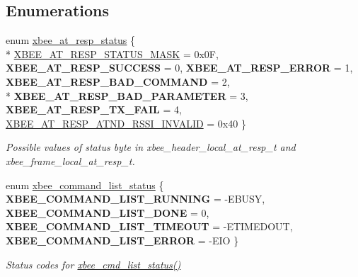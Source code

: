 \subsection*{Enumerations}
\begin{DoxyCompactItemize}
\item 
enum \hyperlink{group__xbee__atcmd_gac6a27f1b1ee32b75b6f966afbb347f22}{xbee\-\_\-at\-\_\-resp\-\_\-status} \{ \\*
\hyperlink{group__xbee__atcmd_ggac6a27f1b1ee32b75b6f966afbb347f22adb75bf991027151c1aa20a454e278145}{X\-B\-E\-E\-\_\-\-A\-T\-\_\-\-R\-E\-S\-P\-\_\-\-S\-T\-A\-T\-U\-S\-\_\-\-M\-A\-S\-K} = 0x0\-F, 
{\bfseries X\-B\-E\-E\-\_\-\-A\-T\-\_\-\-R\-E\-S\-P\-\_\-\-S\-U\-C\-C\-E\-S\-S} = 0, 
{\bfseries X\-B\-E\-E\-\_\-\-A\-T\-\_\-\-R\-E\-S\-P\-\_\-\-E\-R\-R\-O\-R} = 1, 
{\bfseries X\-B\-E\-E\-\_\-\-A\-T\-\_\-\-R\-E\-S\-P\-\_\-\-B\-A\-D\-\_\-\-C\-O\-M\-M\-A\-N\-D} = 2, 
\\*
{\bfseries X\-B\-E\-E\-\_\-\-A\-T\-\_\-\-R\-E\-S\-P\-\_\-\-B\-A\-D\-\_\-\-P\-A\-R\-A\-M\-E\-T\-E\-R} = 3, 
{\bfseries X\-B\-E\-E\-\_\-\-A\-T\-\_\-\-R\-E\-S\-P\-\_\-\-T\-X\-\_\-\-F\-A\-I\-L} = 4, 
\hyperlink{group__xbee__atcmd_ggac6a27f1b1ee32b75b6f966afbb347f22a52c349dd42d745e58fbeb90b51927947}{X\-B\-E\-E\-\_\-\-A\-T\-\_\-\-R\-E\-S\-P\-\_\-\-A\-T\-N\-D\-\_\-\-R\-S\-S\-I\-\_\-\-I\-N\-V\-A\-L\-I\-D} = 0x40
 \}
\begin{DoxyCompactList}\small\item\em Possible values of {\ttfamily status} byte in xbee\-\_\-header\-\_\-local\-\_\-at\-\_\-resp\-\_\-t and xbee\-\_\-frame\-\_\-local\-\_\-at\-\_\-resp\-\_\-t. \end{DoxyCompactList}\item 
enum \hyperlink{group__xbee__atcmd_ga3ec63530d743d1c91126c67493c3245d}{xbee\-\_\-command\-\_\-list\-\_\-status} \{ {\bfseries X\-B\-E\-E\-\_\-\-C\-O\-M\-M\-A\-N\-D\-\_\-\-L\-I\-S\-T\-\_\-\-R\-U\-N\-N\-I\-N\-G} = -\/\-E\-B\-U\-S\-Y, 
{\bfseries X\-B\-E\-E\-\_\-\-C\-O\-M\-M\-A\-N\-D\-\_\-\-L\-I\-S\-T\-\_\-\-D\-O\-N\-E} = 0, 
{\bfseries X\-B\-E\-E\-\_\-\-C\-O\-M\-M\-A\-N\-D\-\_\-\-L\-I\-S\-T\-\_\-\-T\-I\-M\-E\-O\-U\-T} = -\/\-E\-T\-I\-M\-E\-D\-O\-U\-T, 
{\bfseries X\-B\-E\-E\-\_\-\-C\-O\-M\-M\-A\-N\-D\-\_\-\-L\-I\-S\-T\-\_\-\-E\-R\-R\-O\-R} = -\/\-E\-I\-O
 \}
\begin{DoxyCompactList}\small\item\em Status codes for \hyperlink{group__xbee__atcmd_gafb2d1636c675066469ee388170ea27a0}{xbee\-\_\-cmd\-\_\-list\-\_\-status()} \end{DoxyCompactList}\item 

\end{DoxyCompactItemize}

